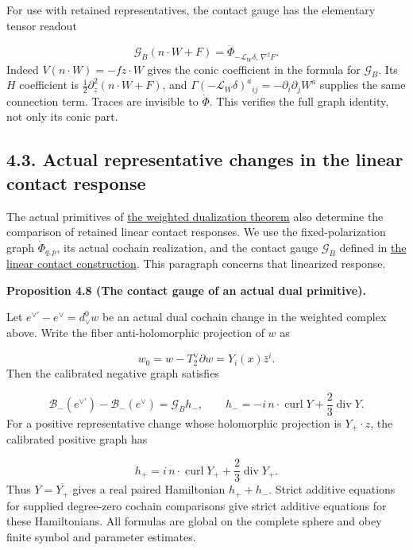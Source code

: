 \documentclass[
  english,
  11pt,
  reqno]{amsart}
\makeatletter
\newcommand{\pandocstatementheading}[1]{%
  \par\addpenalty{\@beginparpenalty}%
  \addvspace{.5\baselineskip plus .2\baselineskip minus .2\baselineskip}%
  {\normalfont\bfseries #1\par}%
  \nobreak\@afterindenttrue\@afterheading
}
\makeatother
\begin{document}
For use with retained representatives, the contact gauge has the
elementary tensor readout

\label{eq:online-contact-scalar-vector-gauge} \[
\mathcal G_B(n\cdot W+F)
=\dot\Phi_{-\mathcal L_W\delta,\,\nabla^2F}.
\] Indeed \(V(n\cdot W)=-fz\cdot W\) gives the conic coefficient in the
formula for \(\mathcal G_B\). Its \(H\) coefficient is
\(\tfrac12\partial_z^2(n\cdot W+F)\), and
\(\Gamma(-\mathcal L_W\delta)^a{}_{ij}=-\partial_i\partial_jW^a\)
supplies the same connection term. Traces are invisible to \(\dot\Phi\).
This verifies the full graph identity, not only its conic part.

\subsection{4.3. Actual representative changes in the linear contact
response}\label{actual-representative-changes-in-the-linear-contact-response}\label{sec:online-dual-representative-contact-comparison}

The actual primitives of
\hyperref[thm:online-actual-weighted-negative-dual]{the weighted
dualization theorem} also determine the comparison of retained linear
contact responses. We use the fixed-polarization graph
\(\dot\Phi_{q,p}\), its actual cochain realization, and the contact
gauge \(\mathcal G_B\) defined in
\hyperref[thm:online-actual-linear-contact-graph]{the linear contact
construction}. This paragraph concerns that linearized response.

\pandocstatementheading{\leavevmode{}\label{prop:online-dual-primitive-linear-contact-gauge}Proposition 4.8 (The contact gauge of an actual dual primitive).}

Let \(e^{\vee\prime}-e^\vee=d_\vee^0w\) be an actual dual cochain change
in the weighted complex above. Write the fiber anti-holomorphic
projection of \(w\) as

\label{eq:online-dual-primitive-holomorphic-projection}
\[
w_0=w-T_2^\vee\partial w=Y_i(x)\bar z^i.
\] Then the calibrated negative graph satisfies

\label{eq:online-dual-primitive-contact-hamiltonian} \[
\mathcal B_-(e^{\vee\prime})-\mathcal B_-(e^\vee)
=\mathcal G_B h_-,
\qquad
h_-=-i\,n\cdot\operatorname{curl}Y+\frac23\operatorname{div}Y.
\] For a positive representative change whose holomorphic projection is
\(Y_+\cdot z\), the calibrated positive graph has

\label{eq:online-positive-primitive-contact-hamiltonian}
\[
h_+=i\,n\cdot\operatorname{curl}Y_+
                   +\frac23\operatorname{div}Y_+ .
\] Thus \(Y=\overline{Y_+}\) gives a real paired Hamiltonian
\(h_++h_-\). Strict additive equations for supplied degree-zero cochain
comparisons give strict additive equations for these Hamiltonians. All
formulas are global on the complete sphere and obey finite symbol and
parameter estimates.
\end{document}
